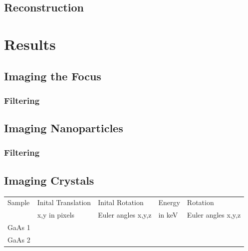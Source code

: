 \subsection{Reconstruction}




\section{Results}
\subsection{Imaging the Focus}
\subsubsection{Filtering}

\subsection{Imaging Nanoparticles}
\subsubsection{Filtering}
\subsection{Imaging Crystals}



\begin{table}[]
	\begin{tabular}{lllll}
		\hline
		Sample & Inital Translation & Inital Rotation    & Energy & Rotation           \\
		& x,y in pixels      & Euler angles x,y,z & in keV    & Euler angles x,y,z \\
		\hline
		GaAs 1 &                    &                    &        &                    \\
		GaAs 2 &                    &                    &        &                   \\
		\hline
	\end{tabular}
\label{tab:kosselfit}
\end{table}
